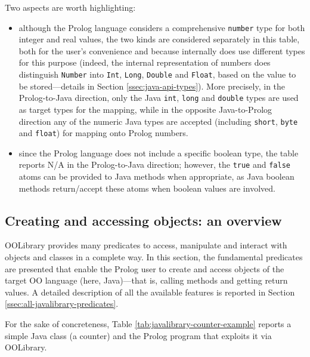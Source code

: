 \noindent Two aspects are worth highlighting:
\begin{itemize}
  \item although the Prolog language considers a comprehensive \texttt{number} type for both integer and real values, the two kinds are considered separately in this table, both for the user's convenience and because \tuprolog{} internally does use different types for this purpose (indeed, the \tuprolog{} internal representation of numbers does distinguish \texttt{Number} into \texttt{Int}, \texttt{Long}, \texttt{Double} and \texttt{Float}, based on the value to be stored---details in Section \ref{ssec:java-api-types}).
      More precisely, in the Prolog-to-Java direction, only the Java \texttt{int}, \texttt{long} and \texttt{double} types are used as target types for the mapping, while in the opposite Java-to-Prolog direction any of the numeric Java types are accepted (including \texttt{short}, \texttt{byte} and \texttt{float}) for mapping onto Prolog numbers.
  \item since the Prolog language does not include a specific boolean type, the table reports N/A in the Prolog-to-Java direction; however, the \texttt{true} and \texttt{false} atoms can be provided to Java methods when appropriate, as Java boolean methods return/accept these atoms when boolean values are involved.
\end{itemize}

\subsection{Creating and accessing objects: an overview}
\label{ssec:creating-and-accessing-objects}

OOLibrary provides many predicates to access, manipulate and interact with objects and classes in a complete way.
In this section, the fundamental predicates are presented that enable the Prolog user to create and access objects of the target OO language (here, Java)---that is, calling methods and getting return values.
A detailed description of all the available features is reported in Section \ref{ssec:all-javalibrary-predicates}.

For the sake of concreteness, Table \ref{tab:javalibrary-counter-example} reports a simple Java class (a counter) and the Prolog program that exploits it via OOLibrary.

